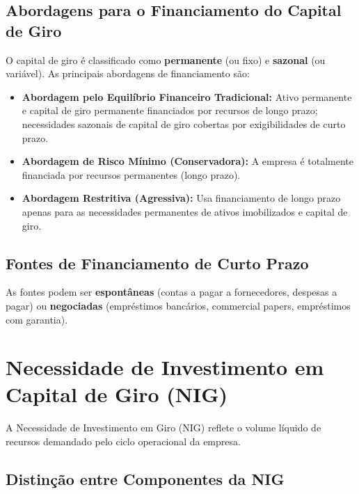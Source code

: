\documentclass[
  a4paper,
]{book}
\providecommand{\tightlist}{%
  \setlength{\itemsep}{0pt}\setlength{\parskip}{0pt}}\usepackage{longtable,booktabs,array}
\begin{document}
\subsection{Abordagens para o Financiamento do Capital de
Giro}\label{abordagens-para-o-financiamento-do-capital-de-giro}

O capital de giro é classificado como \textbf{permanente} (ou fixo) e
\textbf{sazonal} (ou variável). As principais abordagens de
financiamento são:

\begin{itemize}
\tightlist
\item
  \textbf{Abordagem pelo Equilíbrio Financeiro Tradicional:} Ativo
  permanente e capital de giro permanente financiados por recursos de
  longo prazo; necessidades sazonais de capital de giro cobertas por
  exigibilidades de curto prazo.
\item
  \textbf{Abordagem de Risco Mínimo (Conservadora):} A empresa é
  totalmente financiada por recursos permanentes (longo prazo).
\item
  \textbf{Abordagem Restritiva (Agressiva):} Usa financiamento de longo
  prazo apenas para as necessidades permanentes de ativos imobilizados e
  capital de giro.
\end{itemize}

\subsection{Fontes de Financiamento de Curto
Prazo}\label{fontes-de-financiamento-de-curto-prazo}

As fontes podem ser \textbf{espontâneas} (contas a pagar a fornecedores,
despesas a pagar) ou \textbf{negociadas} (empréstimos bancários,
commercial papers, empréstimos com garantia).

\section{Necessidade de Investimento em Capital de Giro
(NIG)}\label{necessidade-de-investimento-em-capital-de-giro-nig}

A Necessidade de Investimento em Giro (NIG) reflete o volume líquido de
recursos demandado pelo ciclo operacional da empresa.

\subsection{Distinção entre Componentes da
NIG}\label{distinuxe7uxe3o-entre-componentes-da-nig}
\end{document}
